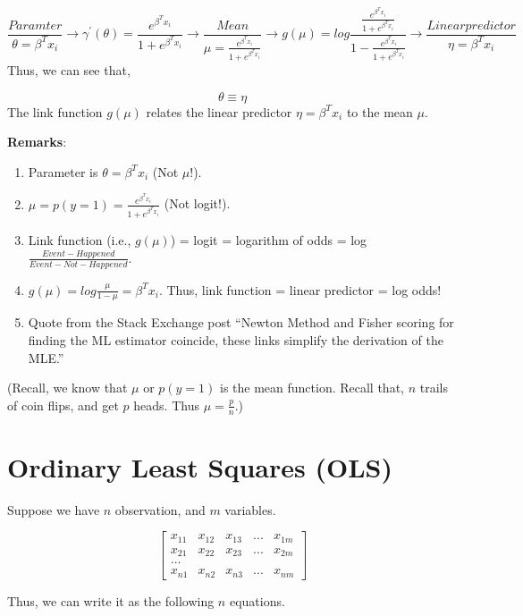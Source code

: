 \documentclass[]{book}
\begin{document}
\[ \frac{Paramter}{\theta=\beta^Tx_i}  \longrightarrow \gamma^{'}(\theta)= \frac{e^{\beta^Tx_i}}{1+e^{\beta^Tx_i}}\longrightarrow \frac{Mean}{\mu=\frac{e^{\beta^Tx_i}}{1+e^{\beta^Tx_i}}}\longrightarrow g(\mu) = log \frac{\frac{e^{\beta^Tx_i}}{1+e^{\beta^Tx_i}}}{1-\frac{e^{\beta^Tx_i}}{1+e^{\beta^Tx_i}}}\longrightarrow \frac{ Linear predictor}{\eta = \beta^Tx_i}\]
Thus, we can see that,

\[\theta \equiv \eta \] The link function \(g(\mu)\) relates the linear
predictor \(\eta = \beta^Tx_i\) to the mean \(\mu\).

\textbf{Remarks}:

\begin{enumerate}
\def\labelenumi{(\arabic{enumi})}
\item
  Parameter is \(\theta = \beta ^T x_i\) (Not \(\mu\)!).
\item
  \(\mu=p(y=1)=\frac{e^{\beta^Tx_i}}{1+e^{\beta^Tx_i}}\) (Not logit!).
\item
  Link function (i.e., \(g(\mu)\)) = logit = logarithm of odds = log
  \(\frac{Event - Happened }{Event - Not - Happened}\).
\item
  \(g(\mu) = log \frac{\mu}{1-\mu}=\beta^T x_i\). Thus, link function =
  linear predictor = log odds!
\item
  Quote from the Stack Exchange post ``Newton Method and Fisher scoring
  for finding the ML estimator coincide, these links simplify the
  derivation of the MLE.''
\end{enumerate}

(Recall, we know that \(\mu\) or \(p(y=1)\) is the mean function. Recall
that, \(n\) trails of coin flips, and get \(p\) heads. Thus
\(\mu = \frac{p}{n}\).)

\section{Ordinary Least Squares (OLS)}\label{ordinary-least-squares-ols}

Suppose we have \(n\) observation, and \(m\) variables.

\[\begin{bmatrix}
x_{11} & x_{12} & x_{13} & ... & x_{1m}\\
x_{21} & x_{22} & x_{23} & ... & x_{2m} \\
...\\
x_{n1} & x_{n2} & x_{n3} & ... & x_{nm}
\end{bmatrix}\]

Thus, we can write it as the following \(n\) equations.
\end{document}
